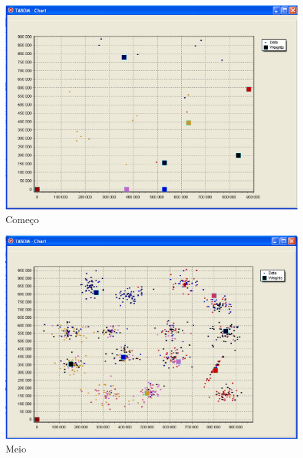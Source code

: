 \begin{figure}[!h]
\centering
\includegraphics[keepaspectratio=true,scale=0.5]
{figuras/tasom1.eps}
\caption{Começo}
\label{data_titatic}
\end{figure}  

\begin{figure}[!h]
\centering
\includegraphics[keepaspectratio=true,scale=0.5]
{figuras/tasom2.eps}
\caption{Meio}
\label{data_titatic}
\end{figure}

